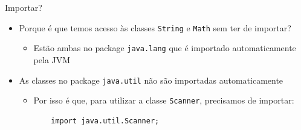 \documentclass[portuguese, aspectratio=169, xcolor=table]{beamer}
\begin{document}
\begin{frame}[fragile]{Importar?}
\begin{itemize}
\item Porque é que temos acesso às classes \texttt{String} e \texttt{Math} sem ter de importar?
\begin{itemize}
    \item Estão ambas no package \texttt{java.lang} que é importado automaticamente pela JVM
\end{itemize}
\item As classes no package \texttt{java.util} não são importadas automaticamente
\begin{itemize}
    \item Por isso é que, para utilizar a classe \texttt{Scanner}, precisamos de importar:
    \begin{verbatim}
    import java.util.Scanner;
    \end{verbatim}
\end{itemize}
\end{itemize}
\end{frame}
\end{document}
